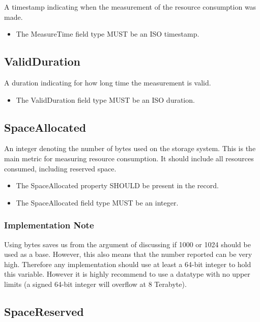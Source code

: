 A timestamp indicating when the measurement of the resource consumption was
made.

\begin{itemize}
\item The MeasureTime field type MUST be an ISO timestamp.
\end{itemize}


\subsection{ValidDuration}

A duration indicating for how long time the measurement is valid.

\begin{itemize}
\item The ValidDuration field type MUST be an ISO duration.
\end{itemize}


\subsection{SpaceAllocated}

An integer denoting the number of bytes used on the storage system. This is the
main metric for measuring resource consumption. It should include all resources
consumed, including reserved space.

\begin{itemize}
\item The SpaceAllocated property SHOULD be present in the record.
\item The SpaceAllocated field type MUST be an integer.
\end{itemize}

\subsubsection*{Implementation Note}

Using bytes saves us from the argument of discussing if 1000 or 1024 should be
used as a base. However, this also means that the number reported can be very
high. Therefore any implementation should use at least a 64-bit integer to hold
this variable. However it is highly recommend to use a datatype with no upper
limits (a signed 64-bit integer will overflow at 8 Terabyte).


\subsection{SpaceReserved}

